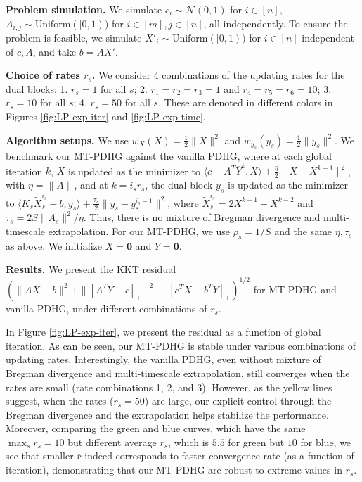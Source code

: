\documentclass[10pt]{article}
\newcommand{\mc}{\mathcal}
\newcommand{\mb}{\mathbf}
\begin{document}
\textbf{Problem simulation.} We simulate $c_i\sim \mc N(0,1)$ for $i\in [n]$, $A_{i,j}\sim \text{Uniform}([0,1))$ for $i\in [m],j\in [n]$, all independently. To ensure the problem is feasible, we simulate $X'_{i}\sim \text{Uniform}([0,1))$ for $i\in [n]$ independent of $c,A$, and take $b = AX'$.

\textbf{Choice of rates $r_s$.} We consider 4 combinations of the updating rates for the dual blocks: 1. $r_s=1$ for all $s$; 2. $r_1 = r_2 = r_3 = 1$ and $r_4 = r_5 = r_6 = 10$; 3. $r_s=10$ for all $s$; 4. $r_s=50$ for all $s$. These are denoted in different colors in Figures \ref{fig:LP-exp-iter} and \ref{fig:LP-exp-time}. 

\textbf{Algorithm setups.} We use $w_X(X) = \frac{1}{2}\|X\|^2$ and $w_{y_s}(y_s) = \frac{1}{2}\|y_s\|^2$. We benchmark our MT-PDHG against the vanilla PDHG, where at each global iteration $k$, $X$ is updated as the minimizer to $\langle c- A^T\overline{Y}^k,X\rangle + \frac{\eta}{2}\|X-X^{k-1}\|^2$, with $\eta = \|A\|$, and at $k = i_sr_s$, the dual block $y_s$ is updated as the minimizer to $\langle K_s\widetilde{X}_s^{i_s}-b,y_s\rangle+ \frac{\tau_s}{2}\|y_s-y_s^{i_s-1}\|^2$, where $\widetilde{X}_s^{i_s} = 2X^{k-1} - X^{k-2}$ and $\tau_s = 2S\|A_s\|^2/\eta$. Thus, there is no mixture of Bregman divergence and multi-timescale extrapolation. For our MT-PDHG, we use $\rho_s = 1/S$ and the same $\eta,\tau_s$ as above. We initialize $X = \mb 0$ and $Y = \mb 0$. 


\textbf{Results.} We present the KKT residual $(\|AX-b\|^2 + \|[A^TY-c]_+\|^2 + [c^TX - b^TY]_+)^{1/2}$ for MT-PDHG and vanilla PDHG, under different combinations of $r_s$. 

In Figure \ref{fig:LP-exp-iter}, we present the residual as a function of global iteration. As can be seen, our MT-PDHG is stable under various combinations of updating rates. Interestingly, the vanilla PDHG, even without mixture of Bregman divergence and multi-timescale extrapolation, still converges when the rates are small (rate combinations 1, 2, and 3). However, as the yellow lines suggest, when the rates ($r_s=50$) are large, our explicit control through the Bregman divergence and the extrapolation helps stabilize the performance. Moreover, comparing the green and blue curves, which have the same $\max_s r_s = 10$ but different average $r_s$, which is $5.5$ for green but $10$ for blue, we see that smaller $\overline{r}$ indeed corresponds to faster convergence rate (as a function of iteration), demonstrating that our MT-PDHG are robust to extreme values in $r_s$. 
\end{document}
